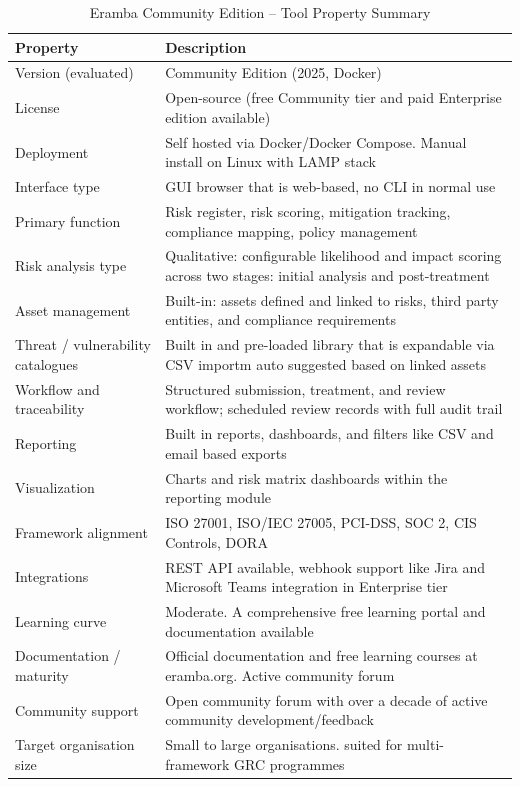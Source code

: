\begin{table}[h]
\centering
\begin{tabular}{|p{4cm}|p{8cm}|}
\hline
\textbf{Property} & \textbf{Description} \\
\hline
Version (evaluated) & Community Edition (2025, Docker)  \\
\hline
License & Open-source (free Community tier and paid Enterprise edition available) \\
\hline
Deployment & Self hosted via Docker/Docker Compose. Manual install on Linux with LAMP stack \\
\hline
Interface type & GUI browser that is web-based, no CLI in normal use \\
\hline
Primary function & Risk register, risk scoring, mitigation tracking, compliance mapping, policy management \\
\hline
Risk analysis type & Qualitative: configurable likelihood and impact scoring across two stages: initial analysis and post-treatment \\
\hline
Asset management & Built-in: assets defined and linked to risks, third party entities, and compliance requirements \\
\hline
Threat / vulnerability catalogues & Built in and pre-loaded library that is expandable via CSV importm auto suggested based on linked assets \\
\hline
Workflow and traceability & Structured submission, treatment, and review workflow; scheduled review records with full audit trail \\
\hline
Reporting & Built in reports, dashboards, and filters like CSV and email based exports \\
\hline
Visualization & Charts and risk matrix dashboards within the reporting module \\
\hline
Framework alignment & ISO 27001, ISO/IEC 27005, PCI-DSS, SOC 2, CIS Controls, DORA \\
\hline
Integrations & REST API available, webhook support like Jira and Microsoft Teams integration in Enterprise tier \\
\hline
Learning curve & Moderate. A comprehensive free learning portal and documentation available \\
\hline
Documentation / maturity & Official documentation and free learning courses at eramba.org. Active community forum \\
\hline
Community support & Open community forum with over a decade of active community development/feedback \\
\hline
Target organisation size & Small to large organisations. suited for multi-framework GRC programmes \\
\hline
\end{tabular}
\caption{Eramba Community Edition -- Tool Property Summary}
\label{tab:eramba}
\end{table}

